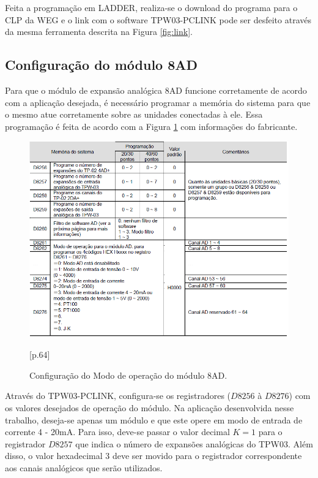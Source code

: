 Feita a programação em LADDER, realiza-se o download do programa para o CLP da WEG e o link com o software TPW03-PCLINK pode ser desfeito através da mesma ferramenta descrita na Figura \ref{fig:link}.

\subsection{Configuração do módulo 8AD}

Para que o módulo de expansão analógica 8AD funcione corretamente de acordo com a aplicação desejada, é necessário programar a memória do sistema para que o mesmo atue corretamente sobre as unidades conectadas à ele. Essa programação é feita de acordo com a Figura \ref{fig:memoria8AD} com informações do fabricante.

\begin{figure}[h!]
\centering
\includegraphics[scale=0.7]{memoria8AD.png}
\caption{Configuração do Modo de operação do módulo 8AD.}\cite{weg2010manualinstalacao}[p.64]
\label{fig:memoria8AD}
\end{figure}

Através do TPW03-PCLINK, configura-se os registradores ($D8256$ à $D8276$) com os valores desejados de operação do módulo. Na aplicação desenvolvida nesse trabalho, deseja-se apenas um módulo e que este opere em modo de entrada de corrente 4 - 20mA.    Para isso, deve-se passar o valor decimal $K = 1$ para o registrador $D8257$ que indica o número de expansões analógicas do TPW03. Além disso, o valor hexadecimal 3 deve ser movido para o registrador correspondente aos canais analógicos que serão utilizados.

